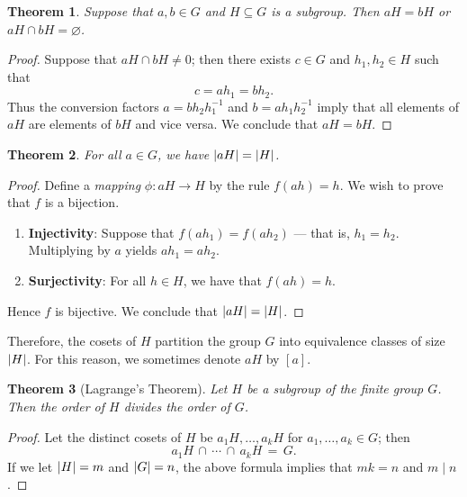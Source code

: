\documentclass[11pt]{article}
\newtheorem{theorem}{Theorem}
\begin{document}
\begin{adjustwidth}{0.5cm}{}
  \begin{theorem}
    Suppose that $a, b \in G$ and $H \subseteq G$ is a subgroup. Then $aH = bH$ or $aH \cap bH = \varnothing$.
  \end{theorem}
  \begin{proof}
    Suppose that $aH \cap bH \ne 0$; then there exists $c \in G$ and $h_{1}, h_{2} \in H$ such that
    \[
      c = ah_{1} = bh_{2}.
    \]
    Thus the conversion factors $a = b h_{2} h_{1}^{-1}$ and $b = a h_{1} h_{2}^{-1}$ imply that all elements of $aH$ are elements of $bH$ and vice versa. We conclude that $aH = bH$.
  \end{proof}
\end{adjustwidth}

\begin{adjustwidth}{0.5cm}{}
  \begin{theorem}
    For all $a \in G$, we have $\abs{aH} = \abs{H}$.
  \end{theorem}
  \begin{proof}
    Define a \textit{mapping} $\phi : aH \to H$ by the rule $f(ah) = h$. We wish to prove that $f$ is a bijection.
    \begin{enumerate}
      \item \textbf{Injectivity}: Suppose that $f(ah_{1}) = f(ah_{2})$ --- that is, $h_{1} = h_{2}$. Multiplying by $a$ yields $ah_{1} = ah_{2}$.
      \item \textbf{Surjectivity}: For all $h \in H$, we have that $f(ah) = h$.
    \end{enumerate}
    Hence $f$ is bijective. We conclude that $\abs{aH} = \abs{H}$.
  \end{proof}
\end{adjustwidth}

Therefore, the cosets of $H$ partition the group $G$ into equivalence classes of size $\abs{H}$. For this reason, we sometimes denote $aH$ by $[a]$.

\begin{adjustwidth}{0.5cm}{}
  \begin{theorem}[Lagrange's Theorem]
    Let $H$ be a subgroup of the finite group $G$. Then the order of $H$ divides the order of $G$.
  \end{theorem}
  \begin{proof}
    Let the distinct cosets of $H$ be $a_{1}H, \ldots, a_{k}H$ for $a_{1}, \ldots, a_{k} \in G$; then
    \[
      a_{1}H \, \cap \, \cdots \, \cap \, a_{k}H \, = \, G.
    \]
    If we let $\abs{H} = m$ and $\abs{G} = n$, the above formula implies that $mk = n$ and $m \mid n$.
  \end{proof}
\end{adjustwidth}
\end{document}
